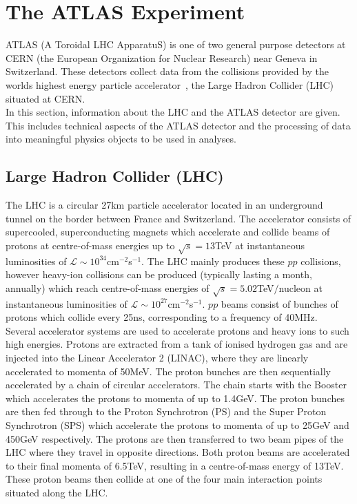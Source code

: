 \section{The ATLAS Experiment}
ATLAS (A Toroidal LHC ApparatuS) is one of two general purpose detectors at CERN (the European Organization for Nuclear Research) near Geneva in Switzerland. These detectors collect data from the collisions provided by the worlds highest energy particle accelerator~\cite{lhc-design-report}, the Large Hadron Collider (LHC) situated at CERN. \\

In this section, information about the LHC and the ATLAS detector are given. This includes technical aspects of the ATLAS detector and the processing of data into meaningful physics objects to be used in analyses.

\subsection{Large Hadron Collider (LHC)}
The LHC is a circular 27km particle accelerator located in an underground tunnel on the border between France and Switzerland. The accelerator consists of supercooled, superconducting magnets which accelerate and collide beams of protons at centre-of-mass energies up to $\sqrt{s} = 13$TeV at instantaneous luminosities of $\mathcal{L} \sim 10^{34}$cm$^{-2}$s$^{-1}$. The LHC mainly produces these $pp$ collisions, however heavy-ion collisions can be produced (typically lasting a month, annually) which reach centre-of-mass energies of $\sqrt{s} = 5.02$TeV$/$nucleon at instantaneous luminosities of $\mathcal{L} \sim 10^{27}$cm$^{-2}$s$^{-1}$. $pp$ beams consist of bunches of protons which collide every 25ns, corresponding to a frequency of 40MHz. \\ 

Several accelerator systems are used to accelerate protons and heavy ions to such high energies. Protons are extracted from a tank of ionised hydrogen gas and are injected into the Linear Accelerator 2 (LINAC), where they are linearly accelerated to momenta of 50MeV. The proton bunches are then sequentially accelerated by a chain of circular accelerators. The chain starts with the Booster which accelerates the protons to momenta of up to 1.4GeV. The proton bunches are then fed through to the Proton Synchrotron (PS) and the Super Proton Synchrotron (SPS) which accelerate the protons to momenta of up to 25GeV and 450GeV respectively. The protons are then transferred to two beam pipes of the LHC where they travel in opposite directions. Both proton beams are accelerated to their final momenta of 6.5TeV, resulting in a centre-of-mass energy of 13TeV. These proton beams then collide at one of the four main interaction points situated along the LHC. \\

